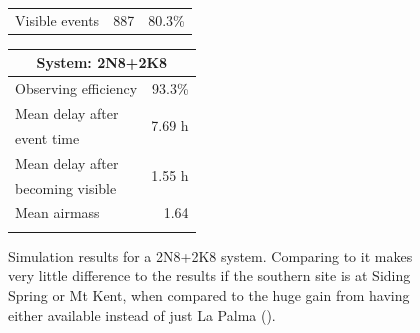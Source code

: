 \begin{colsection}
\begin{colsection}
\begin{figure}[p]
\begin{center}
\begin{minipage}[t]{0.45\textwidth}
\begin{tabular}{lrr}
                \midrule
                Visible events & 887 &  80.3\% \\
            \end{tabular}
        \end{minipage}
        \begin{minipage}[t]{0.37\textwidth}\vspace{0pt}
            \begin{tabular}{lr}
                \multicolumn{2}{c}{\textbf{System: 2N8+2K8}} \\
                \midrule
                Observing efficiency & 93.3\% \\
                \midrule
                Mean delay after     & \multirow{2}{*}{7.69 h} \\
                event time           & \\
                Mean delay after     & \multirow{2}{*}{1.55 h} \\
                becoming visible     & \\
                \midrule
                Mean airmass         & 1.64 \\
                & \\
            \end{tabular}
        \end{minipage}
    \end{center}
    \caption[GW simulation results: 2N8+2K8 system]{
        Simulation results for a 2N8+2K8 system. Comparing to  it makes very little difference to the results if the southern site is at Siding Spring or Mt Kent, when compared to the huge gain from having either available instead of just La Palma ().
    }\label{fig:gw_sim_2n8+2k8}
\end{figure}


\end{colsection}
\end{colsection}
